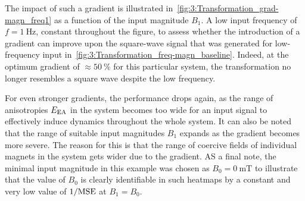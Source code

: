The impact of such a gradient is illustrated in~\cref{fig:3:Transformation_grad-magn_freq1} as a function of the input magnitude $B_1$.
A low input frequency of $f=\SI{1}{\hertz}$, constant throughout the figure, to assess whether the introduction of a gradient can improve upon the square-wave signal that was generated for low-frequency input in~\cref{fig:3:Transformation_freq-magn_baseline}.
Indeed, at the optimum gradient of $\approx \SI{50}{\percent}$ for this particular system, the transformation no longer resembles a square wave despite the low frequency. \par
For even stronger gradients, the performance drops again, as the range of anisotropies $E_\mathrm{EA}$ in the system becomes too wide for an input signal to effectively induce dynamics throughout the whole system.
It can also be noted that the range of suitable input magnitudes $B_1$ expands as the gradient becomes more severe.
The reason for this is that the range of coercive fields of individual magnets in the system gets wider due to the gradient.
AS a final note, the minimal input magnitude in this example was chosen as $B_0=\SI{0}{\milli\tesla}$ to illustrate that the value of $B_0$ is clearly identifiable in such heatmaps by a constant and very low value of $1/\mathrm{MSE}$ at $B_1=B_0$.

